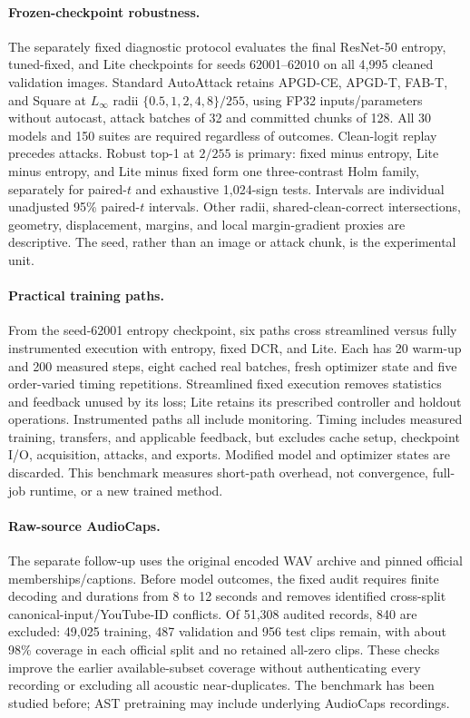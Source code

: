 \documentclass[10pt,a4paper,twocolumn]{article}
\begin{document}
\paragraph{Frozen-checkpoint robustness.}
The separately fixed diagnostic protocol evaluates the final ResNet-50
entropy, tuned-fixed, and Lite checkpoints for seeds 62001--62010 on
all 4,995 cleaned validation images. Standard AutoAttack retains
APGD-CE, APGD-T, FAB-T, and Square at $L_\infty$ radii
$\{0.5,1,2,4,8\}/255$, using FP32 inputs/parameters without autocast,
attack batches of 32 and committed chunks of 128. All 30 models and
150 suites are required regardless of outcomes. Clean-logit replay
precedes attacks. Robust top-1 at $2/255$ is primary: fixed minus entropy,
Lite minus entropy, and Lite minus fixed form one three-contrast Holm
family, separately for paired-$t$ and exhaustive 1,024-sign tests.
Intervals are individual unadjusted 95\% paired-$t$ intervals. Other
radii, shared-clean-correct intersections, geometry, displacement,
margins, and local margin-gradient proxies are descriptive.
The seed, rather than an image or attack chunk, is the experimental unit.

\paragraph{Practical training paths.}
From the seed-62001 entropy checkpoint, six paths cross streamlined
versus fully instrumented execution with entropy, fixed DCR, and Lite.
Each has 20 warm-up and 200 measured steps, eight cached real batches,
fresh optimizer state and five order-varied timing repetitions.
Streamlined fixed execution removes statistics and feedback unused by
its loss; Lite retains its prescribed controller and holdout operations.
Instrumented paths all include monitoring. Timing includes measured
training, transfers, and applicable feedback, but excludes cache setup,
checkpoint I/O, acquisition, attacks, and exports. Modified model and
optimizer states are discarded. This benchmark measures short-path
overhead, not convergence, full-job runtime, or a new trained method.

\paragraph{Raw-source AudioCaps.}
The separate follow-up uses the original encoded WAV archive and pinned
official memberships/captions. Before model outcomes, the fixed audit
requires finite decoding and durations from 8 to 12 seconds and removes
identified cross-split canonical-input/YouTube-ID conflicts. Of 51,308
audited records, 840 are excluded: 49,025 training, 487 validation and
956 test clips remain, with about 98\% coverage in each official split
and no retained all-zero clips. These checks improve the earlier
available-subset coverage without authenticating every recording or
excluding all acoustic near-duplicates. The benchmark has been studied
before; AST pretraining may include underlying AudioCaps recordings.
\end{document}
